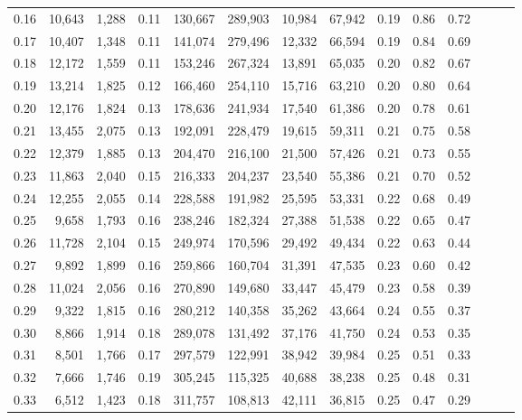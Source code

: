 \begin{tabular}{rrrrrrrrrrrrrr}
0.16 &  10,643 &  1,288 &  0.11 &  130,667 &  289,903 &  10,984 &  67,942 &  0.19 &  0.86 &      0.72 \\
0.17 &  10,407 &  1,348 &  0.11 &  141,074 &  279,496 &  12,332 &  66,594 &  0.19 &  0.84 &      0.69 \\
0.18 &  12,172 &  1,559 &  0.11 &  153,246 &  267,324 &  13,891 &  65,035 &  0.20 &  0.82 &      0.67 \\
0.19 &  13,214 &  1,825 &  0.12 &  166,460 &  254,110 &  15,716 &  63,210 &  0.20 &  0.80 &      0.64 \\
0.20 &  12,176 &  1,824 &  0.13 &  178,636 &  241,934 &  17,540 &  61,386 &  0.20 &  0.78 &      0.61 \\
0.21 &  13,455 &  2,075 &  0.13 &  192,091 &  228,479 &  19,615 &  59,311 &  0.21 &  0.75 &      0.58 \\
0.22 &  12,379 &  1,885 &  0.13 &  204,470 &  216,100 &  21,500 &  57,426 &  0.21 &  0.73 &      0.55 \\
0.23 &  11,863 &  2,040 &  0.15 &  216,333 &  204,237 &  23,540 &  55,386 &  0.21 &  0.70 &      0.52 \\
0.24 &  12,255 &  2,055 &  0.14 &  228,588 &  191,982 &  25,595 &  53,331 &  0.22 &  0.68 &      0.49 \\
0.25 &   9,658 &  1,793 &  0.16 &  238,246 &  182,324 &  27,388 &  51,538 &  0.22 &  0.65 &      0.47 \\
0.26 &  11,728 &  2,104 &  0.15 &  249,974 &  170,596 &  29,492 &  49,434 &  0.22 &  0.63 &      0.44 \\
0.27 &   9,892 &  1,899 &  0.16 &  259,866 &  160,704 &  31,391 &  47,535 &  0.23 &  0.60 &      0.42 \\
0.28 &  11,024 &  2,056 &  0.16 &  270,890 &  149,680 &  33,447 &  45,479 &  0.23 &  0.58 &      0.39 \\
0.29 &   9,322 &  1,815 &  0.16 &  280,212 &  140,358 &  35,262 &  43,664 &  0.24 &  0.55 &      0.37 \\
0.30 &   8,866 &  1,914 &  0.18 &  289,078 &  131,492 &  37,176 &  41,750 &  0.24 &  0.53 &      0.35 \\
0.31 &   8,501 &  1,766 &  0.17 &  297,579 &  122,991 &  38,942 &  39,984 &  0.25 &  0.51 &      0.33 \\
0.32 &   7,666 &  1,746 &  0.19 &  305,245 &  115,325 &  40,688 &  38,238 &  0.25 &  0.48 &      0.31 \\
0.33 &   6,512 &  1,423 &  0.18 &  311,757 &  108,813 &  42,111 &  36,815 &  0.25 &  0.47 &      0.29 \\

\end{tabular}
